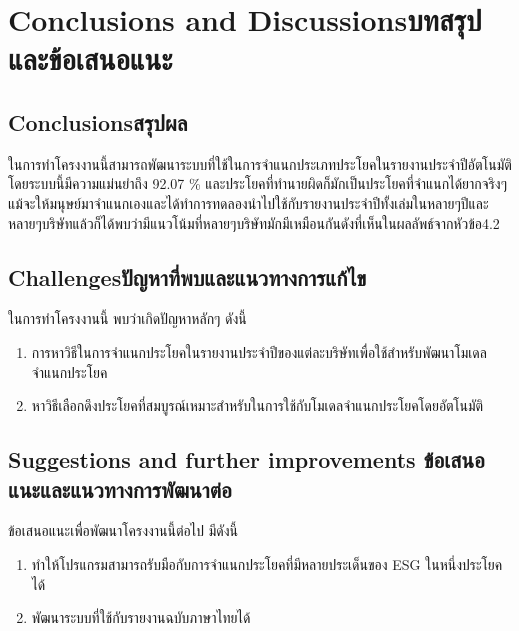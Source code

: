 \chapter{\ifenglish Conclusions and Discussions\else บทสรุปและข้อเสนอแนะ\fi}

\section{\ifenglish Conclusions\else สรุปผล\fi}

ในการทำโครงงานนี้สามารถพัฒนาระบบที่ใช้ในการจำแนกประเภทประโยคในรายงานประจำปีอัตโนมัติ
โดยระบบนี้มีความแม่นยำถึง 92.07 \% และประโยคที่ทำนายผิดก็มักเป็นประโยคที่จำแนกได้ยากจริงๆแม้จะให้มนุษย์มาจำแนกเองและได้ทำการทดลองนำไปใช้กับรายงานประจำปีทั้งเล่มในหลายๆปีและหลายๆบริษัทแล้วก็ได้พบว่ามีแนวโน้มที่หลายๆบริษัทมักมีเหมือนกันดังที่เห็นในผลลัพธ์จากหัวข้อ4.2



\section{\ifenglish Challenges\else ปัญหาที่พบและแนวทางการแก้ไข\fi}

ในการทำโครงงานนี้ พบว่าเกิดปัญหาหลักๆ ดังนี้


\begin{enumerate} 
    \item
    การหาวิธีในการจำแนกประโยคในรายงานประจำปีของแต่ละบริษัทเพื่อใช้สำหรับพัฒนาโมเดลจำแนกประโยค
    \item
    หาวิธีเลือกดึงประโยคที่สมบูรณ์เหมาะสำหรับในการใช้กับโมเดลจำแนกประโยคโดยอัตโนมัติ
\end{enumerate}

\section{\ifenglish%
Suggestions and further improvements
\else%
ข้อเสนอแนะและแนวทางการพัฒนาต่อ
\fi
}

ข้อเสนอแนะเพื่อพัฒนาโครงงานนี้ต่อไป มีดังนี้


\begin{enumerate} 
    \item
    ทำให้โปรแกรมสามารถรับมือกับการจำแนกประโยคที่มีหลายประเด็นของ ESG ในหนึ่งประโยคได้
    \item
    พัฒนาระบบที่ใช้กับรายงานฉบับภาษาไทยได้
\end{enumerate}
